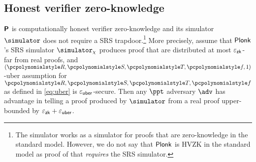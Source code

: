 \documentclass[runningheads,11pt]{llncs}
\begin{document}
\subsection{Honest verifier zero-knowledge}
\begin{lemma}
  $\bm{\mathsf{P}}$ is computationally honest verifier zero-knowledge and its simulator $\simulator$ does
  not require a SRS trapdoor.\footnote{The simulator works as a simulator for
    proofs that are zero-knowledge in the standard model. However, we do not say
    that $\textnormal{\textsf{Plonk}}$ is HVZK in the standard model as proof of that \emph{requires}
    the SRS simulator.} More precisely, assume that $\textnormal{\textsf{Plonk}}$'s SRS simulator
  $\simulator_\chi$ produces proof that are distributed at most $\varepsilon_{\mathsf{zk}}$-far
  from real proofs, and $(\pR, \pS, \pT, \pf, 1)$-uber assumption for
  $\pR, \pS, \pT, \pf$ as defined in \cref{eq:uber} is $\varepsilon_{\mathsf{uber}}$-secure. Then
  any $\ppt$ adversary $\adv$ has advantage in telling a proof produced by
  $\simulator$ from a real proof upper-bounded by $\varepsilon_{\mathsf{zk}} + \varepsilon_{\mathsf{uber}}$.
\end{lemma}
\end{document}
